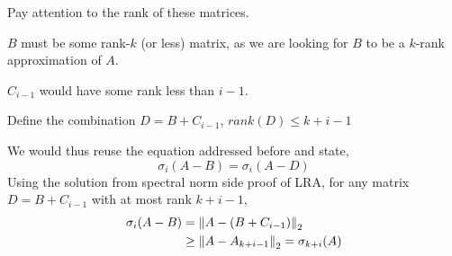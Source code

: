 Pay attention to the rank of these matrices.
\begin{bindenum}
    \item $B$ must be some rank-$k$ (or less) matrix, as we are looking for $B$ to be a $k$-rank approximation of $A$.
    \item $C_{i - 1}$ would have some rank less than $i - 1$.
    \item Define the combination $D = B + C_{i - 1}$, $rank(D) \leq k + i - 1$
\end{bindenum}
We would thus reuse the equation addressed before and state,
\[
    \sigma_i (A - B) = \sigma_i (A - D)
\]
Using the solution from spectral norm side proof of LRA, for any matrix $D = B + C_{i - 1}$ with at most rank $k + i - 1$,
\begin{align*}
    \sigma_i (A - B) &= {\| A - (B + C_{i - 1}) \|}_{2}^{} \\
    &\geq {\| A - A_{k + i - 1} \|}_{2}^{} = \sigma_{k + i} (A)
\end{align*}
